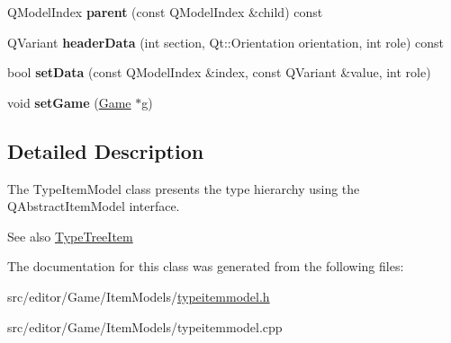 \begin{DoxyCompactItemize}
\item 
\hypertarget{class_type_item_model2_adb2ca56a022cf9330866a97289ac4e4f}{\-Q\-Model\-Index {\bfseries parent} (const \-Q\-Model\-Index \&child) const }\label{class_type_item_model2_adb2ca56a022cf9330866a97289ac4e4f}

\item 
\hypertarget{class_type_item_model2_a4e6b463dd55c2d0d20150609141e34aa}{\-Q\-Variant {\bfseries header\-Data} (int section, \-Qt\-::\-Orientation orientation, int role) const }\label{class_type_item_model2_a4e6b463dd55c2d0d20150609141e34aa}

\item 
\hypertarget{class_type_item_model2_ab23b2718713c12b7659da72d21c97543}{bool {\bfseries set\-Data} (const \-Q\-Model\-Index \&index, const \-Q\-Variant \&value, int role)}\label{class_type_item_model2_ab23b2718713c12b7659da72d21c97543}

\item 
\hypertarget{class_type_item_model2_a1d6c0574a82def6fa878f7568cb0e53f}{void {\bfseries set\-Game} (\hyperlink{class_game}{\-Game} $\ast$g)}\label{class_type_item_model2_a1d6c0574a82def6fa878f7568cb0e53f}

\end{DoxyCompactItemize}


\subsection{\-Detailed \-Description}
\-The \-Type\-Item\-Model class presents the type hierarchy using the \-Q\-Abstract\-Item\-Model interface. 

\begin{DoxySeeAlso}{\-See also}
\hyperlink{class_type_tree_item}{\-Type\-Tree\-Item} 
\end{DoxySeeAlso}


\-The documentation for this class was generated from the following files\-:\begin{DoxyCompactItemize}
\item 
src/editor/\-Game/\-Item\-Models/\hyperlink{typeitemmodel_8h}{typeitemmodel.\-h}\item 
src/editor/\-Game/\-Item\-Models/typeitemmodel.\-cpp\end{DoxyCompactItemize}
